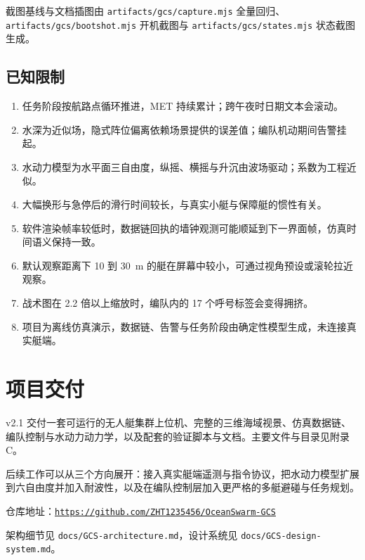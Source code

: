 \documentclass[UTF8, a4paper, 11pt]{ctexart}
\newcommand{\file}[1]{\texttt{#1}}
\newcommand{\repolink}{\href{https://github.com/ZHT1235456/OceanSwarm-GCS}{\texttt{https://github.com/ZHT1235456/OceanSwarm-GCS}}}
\begin{document}
截图基线与文档插图由 \file{artifacts/gcs/capture.mjs} 全量回归、\file{artifacts/gcs/bootshot.mjs} 开机截图与 \file{artifacts/gcs/states.mjs} 状态截图生成。

\subsection{已知限制}

\begin{enumerate}
  \item 任务阶段按航路点循环推进，MET 持续累计；跨午夜时日期文本会滚动。
  \item 水深为近似场，隐式阵位偏离依赖场景提供的误差值；编队机动期间告警挂起。
  \item 水动力模型为水平面三自由度，纵摇、横摇与升沉由波场驱动；系数为工程近似。
  \item 大幅换形与急停后的滑行时间较长，与真实小艇与保障艇的惯性有关。
  \item 软件渲染帧率较低时，数据链回执的墙钟观测可能顺延到下一界面帧，仿真时间语义保持一致。
  \item 默认观察距离下 10 到 30~m 的艇在屏幕中较小，可通过视角预设或滚轮拉近观察。
  \item 战术图在 2.2 倍以上缩放时，编队内的 17 个呼号标签会变得拥挤。
  \item 项目为离线仿真演示，数据链、告警与任务阶段由确定性模型生成，未连接真实艇端。
\end{enumerate}

\section{项目交付}

v2.1 交付一套可运行的无人艇集群上位机、完整的三维海域视景、仿真数据链、编队控制与水动力动力学，以及配套的验证脚本与文档。主要文件与目录见附录 C。

后续工作可以从三个方向展开：接入真实艇端遥测与指令协议，把水动力模型扩展到六自由度并加入耐波性，以及在编队控制层加入更严格的多艇避碰与任务规划。

\vspace{0.8em}
\noindent 仓库地址：\repolink

\noindent 架构细节见 \file{docs/GCS-architecture.md}，设计系统见 \file{docs/GCS-design-system.md}。

\appendix
\end{document}

